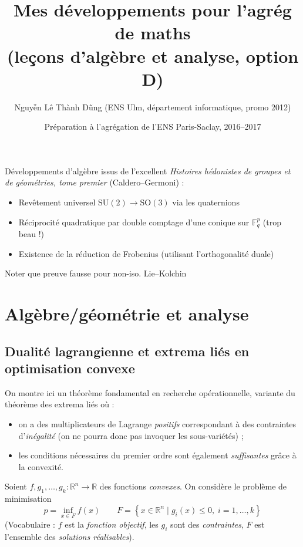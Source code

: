 \documentclass[a4paper, 11pt]{article}
\def\F{\mathbb{F}}
\def\R{\mathbb{R}}
\begin{document}
\title{Mes développements pour l'agrég de maths\\
  (leçons d'algèbre et analyse, option D)}
\author{Nguyễn Lê Thành Dũng (ENS Ulm, département informatique, promo 2012)}
\date{Préparation à l'agrégation de l'ENS Paris-Saclay, 2016--2017}
\maketitle


Développements d'algèbre issus de l'excellent \emph{Histoires hédonistes de
  groupes et de géométries, tome premier} (Caldero--Germoni) :
\begin{itemize}
\item Revêtement universel $\mathrm{SU}(2) \to \mathrm{SO}(3)$ via les
  quaternions
\item Réciprocité quadratique par double comptage d'une conique sur $\F_q^p$
  (trop beau !)
\item Existence de la réduction de Frobenius (utilisant l'orthogonalité duale)
\end{itemize}
Noter que preuve fausse pour non-iso.
Lie--Kolchin

\newpage

\tableofcontents

\newpage

\section{Algèbre/géométrie et analyse}

\subsection{Dualité lagrangienne et extrema liés en optimisation convexe}

On montre ici un théorème fondamental en recherche opérationnelle, variante du
théorème des extrema liés où :
\begin{itemize}
\item on a des multiplicateurs de Lagrange \emph{positifs} correspondant à des
  contraintes d'\emph{inégalité} (on ne pourra donc pas invoquer les
  sous-variétés) ;
\item les conditions nécessaires du premier ordre sont également
  \emph{suffisantes} grâce à la convexité.
\end{itemize}
Soient $f,g_1,\ldots,g_k : \R^n \to \R$ des fonctions \emph{convexes}.
On considère le problème de minimisation
\[ p = \inf_{x \in F} f(x) \qquad F = \left\{ x \in \R^n \mid
  g_i(x) \leq 0,\; i = 1,\ldots,k \right\} \]
(Vocabulaire : $f$ est la \emph{fonction objectif}, les $g_i$ sont des
\emph{contraintes}, $F$ est l'ensemble des \emph{solutions réalisables}).
\end{document}
